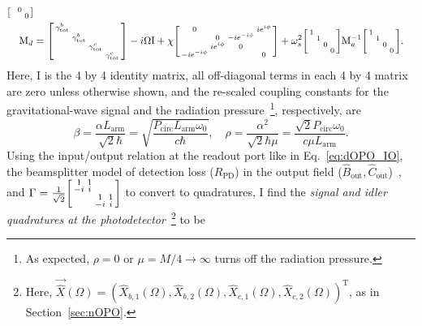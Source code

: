 \begin{align}
\begin{bsmallmatrix}
 &  & 0 &  \\
 &  &  & 0
\end{bsmallmatrix}\\
\text{M}_d&=\begin{bsmallmatrix}
\gamma^b_\mathrm{tot} &  &  &  \\
 & \gamma^b_\mathrm{tot} &  &  \\
 &  & \gamma^c_\mathrm{tot} &  \\
 &  &  & \gamma^c_\mathrm{tot} 
\end{bsmallmatrix}-i\Omega \text{I}+\chi \begin{bsmallmatrix}
0 &  &  & i e^{i\phi} \\
 & 0 & -i e^{-i\phi} &  \\
 & i e^{i\phi} & 0 &  \\
-i e^{-i\phi} &  &  & 0
\end{bsmallmatrix}+\omega_s^2\begin{bsmallmatrix}
1 &  &  &  \\
 & 1 &  &  \\
 &  & 0 &  \\
 &  &  & 0
\end{bsmallmatrix}\text{M}_a^{-1}\begin{bsmallmatrix}
1 &  &  &  \\
 & 1 &  &  \\
 &  & 0 &  \\
 &  &  & 0
\end{bsmallmatrix}.
\end{align}
Here, $\text{I}$ is the 4 by 4 identity matrix, all off-diagonal terms in each 4 by 4 matrix are zero unless otherwise shown, and the re-scaled coupling constants for the gravitational-wave signal and the radiation pressure~\footnote{As expected, $\rho=0$ or $\mu=M/4\rightarrow\infty$ turns off the radiation pressure.}, respectively, are
\begin{equation}\label{eq:beta_and_rho}
\beta = \frac{\alpha L_\mathrm{arm}}{\sqrt{2}\hbar}=\sqrt{\frac{ P_\text{circ}L_\text{arm} \omega_0 }{c  \hbar}},\quad \rho = \frac{\alpha^2}{\sqrt{2}\hbar\mu}=\frac{\sqrt{2} P_\text{circ} \omega_0}{c \mu L_\text{arm}}.
\end{equation}
Using the input/output relation at the readout port like in Eq.~\ref{eq:dOPO_IO}, the beamsplitter model of detection loss ($R_\text{PD}$) in the output field ($\hat{B}_\text{out}, \hat{C}_\text{out}$)~\cite{}, and $\Gamma= \frac{1}{\sqrt2}\begin{bsmallmatrix}
1 & 1 &  &  \\
-i & i &  &  \\
 &  & 1 & 1 \\
 &  & -i & i
\end{bsmallmatrix}$ to convert to quadratures, I find the \emph{signal and idler quadratures at the photodetector}~\footnote{Here, $\vec{\hat X}(\Omega)=(\hat X_{b,1}(\Omega),\hat X_{b,2}(\Omega),\hat X_{c,1}(\Omega),\hat X_{c,2}(\Omega))^\text{T}$, as in Section~\ref{sec:nOPO}.} to be
